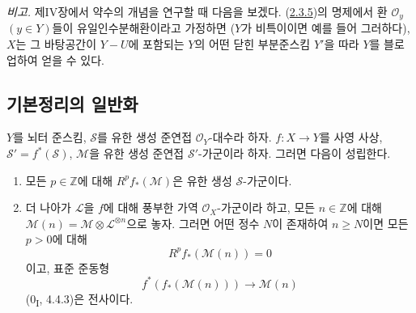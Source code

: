 \begin{env}[2.3.8]
\label{III.2.3.8-fr}
\emph{비고.} 제IV장에서 약수의 개념을 연구할 때 다음을 보겠다.
(\hyperref[III.2.3.5-fr]{2.3.5})의 명제에서 환
$\mathcal O_y$ $(y\in Y)$들이 유일인수분해환이라고 가정하면
($Y$가 비특이이면 예를 들어 그러하다), $X$는 그 바탕공간이
$Y-U$에 포함되는 $Y$의 어떤 닫힌 부분준스킴 $Y'$을 따라
$Y$를 블로업하여 얻을 수 있다.
\end{env}

\subsection{기본정리의 일반화}
\label{subsection:III.2.4-fr}

\begin{theorem}[2.4.1]
\label{III.2.4.1-fr}
$Y$를 뇌터 준스킴, $\mathcal S$를 유한 생성 준연접
$\mathcal O_Y$-대수라 하자. $f:X\to Y$를 사영 사상,
$\mathcal S'=f^*(\mathcal S)$, $\mathcal M$을 유한 생성 준연접
$\mathcal S'$-가군이라 하자. 그러면 다음이 성립한다.
\begin{enumerate}
\item[(i)] 모든 $p\in\mathbb Z$에 대해 $R^pf_*(\mathcal M)$은 유한
생성 $\mathcal S$-가군이다.
\item[(ii)] 더 나아가 $\mathcal L$을 $f$에 대해 풍부한 가역
$\mathcal O_X$-가군이라 하고, 모든 $n\in\mathbb Z$에 대해
$\mathcal M(n)=\mathcal M\otimes\mathcal L^{\otimes n}$으로 놓자.
그러면 어떤 정수 $N$이 존재하여 $n\geq N$이면 모든 $p>0$에 대해
\[
R^pf_*(\mathcal M(n))=0
\tag{2.4.1.1}\label{III.2.4.1.1-fr}
\]
이고, 표준 준동형
\[
f^*(f_*(\mathcal M(n)))\longrightarrow\mathcal M(n)
\]
(0\textsubscript{I}, 4.4.3)은 전사이다.
\end{enumerate}
\end{theorem}

